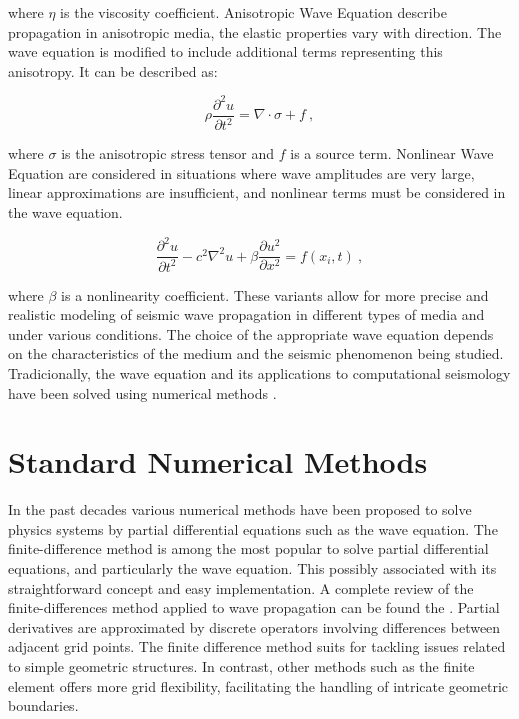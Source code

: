 \documentclass[11pt,twoside]{article}
\begin{document}
\noindent where $\eta$ is the viscosity coefficient. Anisotropic Wave Equation describe propagation in anisotropic media, 
the elastic properties vary with direction. The wave equation is modified to include additional terms representing 
this anisotropy. It can be described as:

\begin{equation*}
\rho \frac{\partial^2 u}{\partial t^2} = \nabla \cdot \sigma + f \ ,
\label{anisotropic}
\end{equation*}
    
\noindent where $\sigma$ is the anisotropic stress tensor and $f$ is a source term. Nonlinear Wave Equation are considered 
in situations where wave amplitudes are very large, linear approximations are insufficient, and nonlinear terms 
must be considered in the wave equation.

\begin{equation*}
\frac{\partial^2 u}{\partial t^2} - c^2 \nabla^2 u + \beta \frac{\partial u^2}{\partial x^2} = f(x_i, t) \ ,
\label{nonlinear}
\end{equation*}
    
\noindent where $\beta$ is a nonlinearity coefficient. These variants allow for more precise and realistic modeling 
of seismic wave propagation in different types of media and under various conditions. The choice of the 
appropriate wave equation depends on the characteristics of the medium and the seismic phenomenon being studied. 
Tradicionally, the wave equation and its applications to computational seismology have been solved using 
numerical methods \citep{Igel2017}.

\section{Standard Numerical Methods}\label{sec:standard_numerical_methods}

In the past decades various numerical methods have been proposed to solve physics systems by partial differential 
equations such as the wave equation. The finite-difference method is among the most 
popular to solve partial differential equations, and particularly the wave equation. This possibly associated with 
its straightforward concept and easy implementation. A complete review of the finite-differences method applied to 
wave propagation can be found the . Partial derivatives are approximated by discrete operators 
involving differences between adjacent grid points. The finite difference method suits for tackling issues related to 
simple geometric structures. In contrast, other methods such as the finite element offers more grid flexibility, 
facilitating the handling of intricate geometric boundaries.
\end{document}
